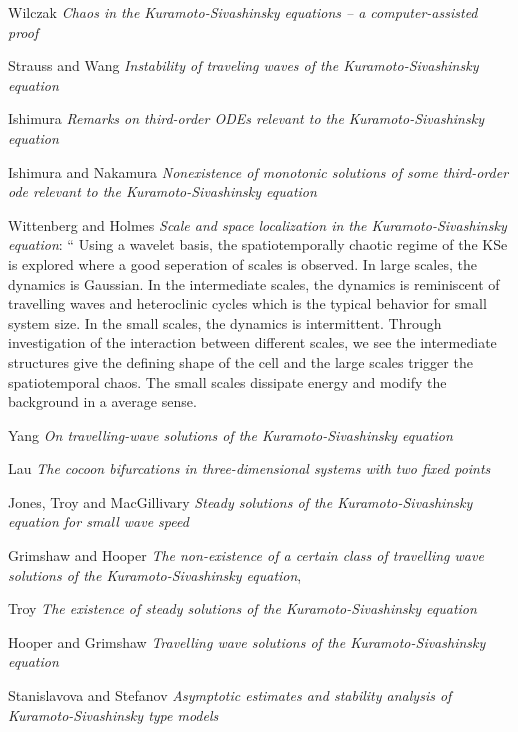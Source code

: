 \begin{description}
Wilczak
{\em Chaos in the {Kuramoto-Sivashinsky} equations -- a computer-assisted proof}

Strauss and Wang
 {\em Instability of traveling waves of the {Kuramoto-Sivashinsky} equation}

Ishimura
{\em Remarks on third-order {ODEs} relevant to the {Kuramoto-Sivashinsky} equation}

Ishimura and Nakamura
{\em Nonexistence of monotonic solutions of some third-order ode relevant
to the {Kuramoto-Sivashinsky} equation}

Wittenberg and Holmes
{\em Scale and space localization in the {Kuramoto-Sivashinsky} equation}:
  ``
Using a wavelet basis, the spatiotemporally chaotic regime of the
    KSe is explored where a good seperation of scales is observed. In
    large scales, the dynamics is Gaussian. In the intermediate scales,
    the dynamics is reminiscent of travelling waves and heteroclinic
    cycles which is the typical behavior for small system size. In the
    small scales, the dynamics is intermittent. Through investigation
    of the interaction between different scales, we see the intermediate
    structures give the defining shape of the cell and the large scales
    trigger the spatiotemporal chaos. The small scales dissipate energy
    and modify the background in a average sense.

Yang
{\em On travelling-wave solutions of the {Kuramoto-Sivashinsky} equation}


Lau
{\em The cocoon bifurcations in three-dimensional systems with two fixed points}

Jones, Troy and MacGillivary
{\em Steady solutions of the {Kuramoto-Sivashinsky} equation for small wave speed}

Grimshaw and Hooper
{\em The non-existence of a certain class of travelling wave solutions of
the {Kuramoto-Sivashinsky} equation},

Troy
{\em The existence of steady solutions of the {Kuramoto-Sivashinsky} equation}

Hooper and Grimshaw
{\em Travelling wave solutions of the {Kuramoto-Sivashinsky} equation}

Stanislavova and Stefanov
{\em Asymptotic estimates and stability analysis of {Kuramoto-Sivashinsky}
type models}

\end{description}

